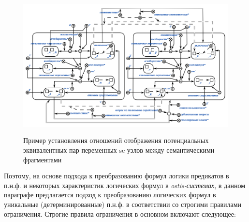 \begin{figure}[H]
	\caption{Пример установления отношений отображения потенциальных эквивалентных пар переменных sc-узлов между семантическими фрагментами}
	\includegraphics[scale=0.65]{author/part7/figures/establishment_mapping_relationship_example.png}
	\label{fig:EMR_example}
\end{figure}

Поэтому, на основе подхода к преобразованию формул логики предикатов в п.н.ф. и некоторых характеристик логических формул в \textit{ostis-системах}, в данном параграфе предлагается подход к преобразованию логических формул в уникальные (детерминированные) п.н.ф. в соответствии со строгими правилами ограничения. Строгие правила ограничения в основном включают следующее:

